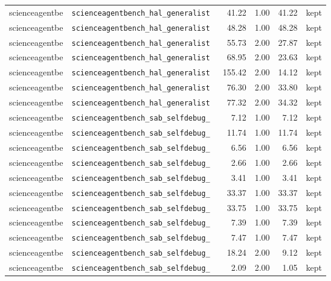 {\begin{longtable}{llrrrl}
scienceagentbe & \texttt{\scriptsize scienceagentbench\_hal\_generalist~} & 41.22 & 1.00 & 41.22 & kept \\
scienceagentbe & \texttt{\scriptsize scienceagentbench\_hal\_generalist~} & 48.28 & 1.00 & 48.28 & kept \\
scienceagentbe & \texttt{\scriptsize scienceagentbench\_hal\_generalist~} & 55.73 & 2.00 & 27.87 & kept \\
scienceagentbe & \texttt{\scriptsize scienceagentbench\_hal\_generalist~} & 68.95 & 2.00 & 23.63 & kept \\
scienceagentbe & \texttt{\scriptsize scienceagentbench\_hal\_generalist~} & 155.42 & 2.00 & 14.12 & kept \\
scienceagentbe & \texttt{\scriptsize scienceagentbench\_hal\_generalist~} & 76.30 & 2.00 & 33.80 & kept \\
scienceagentbe & \texttt{\scriptsize scienceagentbench\_hal\_generalist~} & 77.32 & 2.00 & 34.32 & kept \\
scienceagentbe & \texttt{\scriptsize scienceagentbench\_sab\_selfdebug\_~} & 7.12 & 1.00 & 7.12 & kept \\
scienceagentbe & \texttt{\scriptsize scienceagentbench\_sab\_selfdebug\_~} & 11.74 & 1.00 & 11.74 & kept \\
scienceagentbe & \texttt{\scriptsize scienceagentbench\_sab\_selfdebug\_~} & 6.56 & 1.00 & 6.56 & kept \\
scienceagentbe & \texttt{\scriptsize scienceagentbench\_sab\_selfdebug\_~} & 2.66 & 1.00 & 2.66 & kept \\
scienceagentbe & \texttt{\scriptsize scienceagentbench\_sab\_selfdebug\_~} & 3.41 & 1.00 & 3.41 & kept \\
scienceagentbe & \texttt{\scriptsize scienceagentbench\_sab\_selfdebug\_~} & 33.37 & 1.00 & 33.37 & kept \\
scienceagentbe & \texttt{\scriptsize scienceagentbench\_sab\_selfdebug\_~} & 33.75 & 1.00 & 33.75 & kept \\
scienceagentbe & \texttt{\scriptsize scienceagentbench\_sab\_selfdebug\_~} & 7.39 & 1.00 & 7.39 & kept \\
scienceagentbe & \texttt{\scriptsize scienceagentbench\_sab\_selfdebug\_~} & 7.47 & 1.00 & 7.47 & kept \\
scienceagentbe & \texttt{\scriptsize scienceagentbench\_sab\_selfdebug\_~} & 18.24 & 2.00 & 9.12 & kept \\
scienceagentbe & \texttt{\scriptsize scienceagentbench\_sab\_selfdebug\_~} & 2.09 & 2.00 & 1.05 & kept \\

\end{longtable}}
